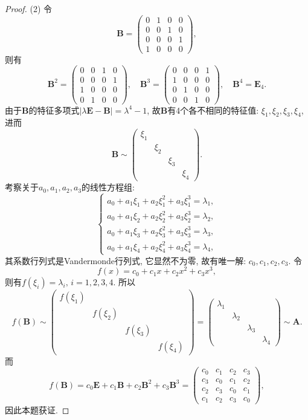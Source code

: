 \documentclass[../../main.tex]{subfiles}
\begin{document}
\begin{proof}
(2) 令
$$
\boldsymbol{B} = \begin{pmatrix}
0 & 1 & 0 & 0 \\
0 & 0 & 1 & 0 \\
0 & 0 & 0 & 1 \\
1 & 0 & 0 & 0
\end{pmatrix},
$$
则有
$$
\boldsymbol{B}^2 = \begin{pmatrix}
0 & 0 & 1 & 0 \\
0 & 0 & 0 & 1 \\
1 & 0 & 0 & 0 \\
0 & 1 & 0 & 0
\end{pmatrix}, \quad \boldsymbol{B}^3 = \begin{pmatrix}
0 & 0 & 0 & 1 \\
1 & 0 & 0 & 0 \\
0 & 1 & 0 & 0 \\
0 & 0 & 1 & 0
\end{pmatrix}, \quad \boldsymbol{B}^4 = \boldsymbol{E}_4.
$$
由于$\boldsymbol{B}$的特征多项式$|\lambda \boldsymbol{E} - \boldsymbol{B}| = \lambda^4 - 1$, 故$\boldsymbol{B}$有4个各不相同的特征值: $\xi_1,\xi_2,\xi_3,\xi_4$, 进而
$$
\boldsymbol{B} \sim \begin{pmatrix}
\xi_1 & & & \\
& \xi_2 & & \\
& & \xi_3 & \\
& & & \xi_4
\end{pmatrix}.
$$
考察关于$a_0,a_1,a_2,a_3$的线性方程组:
$$
\begin{cases}
a_0 + a_1 \xi_1 + a_2 \xi_1^2 + a_3 \xi_1^3 = \lambda_1, \\
a_0 + a_1 \xi_2 + a_2 \xi_2^2 + a_3 \xi_2^3 = \lambda_2, \\
a_0 + a_1 \xi_3 + a_2 \xi_3^2 + a_3 \xi_3^3 = \lambda_3, \\
a_0 + a_1 \xi_4 + a_2 \xi_4^2 + a_3 \xi_4^3 = \lambda_4,
\end{cases}
$$
其系数行列式是Vandermonde行列式, 它显然不为零, 故有唯一解: $c_0,c_1,c_2,c_3$. 令
$$
f(x) = c_0 + c_1 x + c_2 x^2 + c_3 x^3,
$$
则有$f(\xi_i) = \lambda_i, \, i = 1,2,3,4$. 所以
$$
f(\boldsymbol{B}) \sim \begin{pmatrix}
f(\xi_1) & & & \\
& f(\xi_2) & & \\
& & f(\xi_3) & \\
& & & f(\xi_4)
\end{pmatrix} = \begin{pmatrix}
\lambda_1 & & & \\
& \lambda_2 & & \\
& & \lambda_3 & \\
& & & \lambda_4
\end{pmatrix} \sim \boldsymbol{A}.
$$
而
$$
f(\boldsymbol{B}) = c_0 \boldsymbol{E} + c_1 \boldsymbol{B} + c_2 \boldsymbol{B}^2 + c_3 \boldsymbol{B}^3 = \begin{pmatrix}
c_0 & c_1 & c_2 & c_3 \\
c_3 & c_0 & c_1 & c_2 \\
c_2 & c_3 & c_0 & c_1 \\
c_1 & c_2 & c_3 & c_0
\end{pmatrix},
$$
因此本题获证.
\end{proof}
\end{document}
